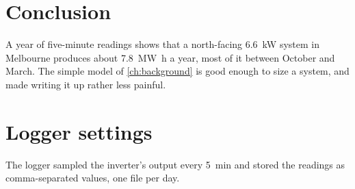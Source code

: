 \documentclass[11pt,a4paper]{report}    %
\begin{document}
\chapter{Conclusion}\label{ch:conclusion}

A year of five-minute readings shows that a north-facing \qty{6.6}{\kilo\watt} system in Melbourne produces
about \qty{7.8}{\mega\watt\hour} a year, most of it between October and March. The simple
model of \cref{ch:background} is good enough to size a system, and \citet{Lamport1994} made
writing it up rather less painful.

\cleardoublepage
{}
{}

\printbibliography

\appendix
\chapter{Logger settings}\label{app:logger}

The logger sampled the inverter's output every \qty{5}{\minute} and stored the readings as
comma-separated values, one file per day.
\end{document}

